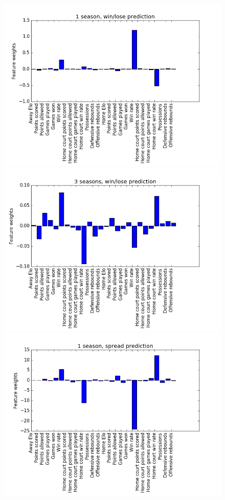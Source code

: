 \documentclass{article}
\begin{document}
\begin{figure}[width=\linewidth]
\centering
\begin{multicols}{2}
  \includegraphics[width=1.2\linewidth]{code/figures/1season,winlose.png}
  \includegraphics[width=1.2\linewidth]{code/figures/3seasons,winlose.png}
  \includegraphics[width=1.2\linewidth]{code/figures/1season,spreads.png}

\end{multicols}
\end{figure}
\end{document}
